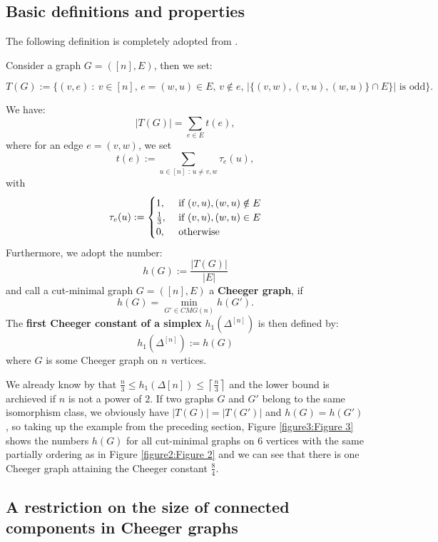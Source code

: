 \subsection{Basic definitions and properties}
The following definition is completely adopted from \cite{1}.
\begin{defi}\label{definition1}
Consider a graph \(G=([n],E)\), then we set:
\begin{small}
\[
T(G):=\{(v,e)\: :\: v\in [n]\text{, }e=(w,u)\in E\text{, }v\notin e\text{, }|\{(v,w),(v,u),(w,u)\}\cap E\}|\text{ is odd}\}.
\]
\end{small}
We have:
\[
|T(G)|=\sum\limits_{e\in E}t(e),
\]
where for an edge \(e=(v,w)\), we set
\[
t(e):=\sum\limits_{u\in[n]\text{ : }u\neq v,w}\tau_e(u),
\]
with
\begin{equation}
\tau_e(u):=
\begin{cases}
1,&\text{ if }(v,u),(w,u)\notin E\notag\\
\frac{1}{3},&\text{ if }(v,u),(w,u)\in E\notag\\
0,&\text{ otherwise}\notag
\end{cases}
\end{equation}
Furthermore, we adopt the number:
\[
h(G):=\frac{|T(G)|}{|E|}
\]
and call a cut-minimal graph \(G=([n],E)\) a \textbf{Cheeger graph}, if
\[
h(G)=\min\limits_{G'\in CMG(n)}h(G').
\]
The \textbf{first Cheeger constant of a simplex} \(h_1(\Delta^{[n]})\) is then defined by:
\[
h_1(\Delta^{[n]}):=h(G)
\]
where \(G\) is some Cheeger graph on \(n\) vertices.
\end{defi}
We already know by \cite{1} that \(\frac{n}{3}\leq h_1(\Delta{[n]})\leq\left\lceil\frac{n}{3}\right\rceil\) and the lower bound is archieved if \(n\) is not a power of \(2\). If two graphs \(G\) and \(G'\) belong to the same isomorphism class, we obviously have \(|T(G)|=|T(G')|\) and \(h(G)=h(G')\), so taking up the example from the preceding section, Figure \ref{figure3:Figure 3} shows the numbers \(h(G)\) for all cut-minimal graphs on \(6\) vertices with the same partially ordering as in Figure \ref{figure2:Figure 2} and we can see that there is one Cheeger graph attaining the Cheeger constant \(\frac{8}{4}\).



\subsection{A restriction on the size of connected components in Cheeger graphs}

